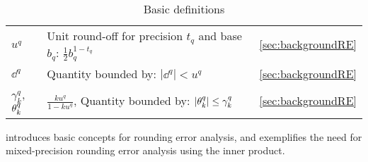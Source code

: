 \begin{table}[H]
\begin{tabular}{|m{1.7cm}|m{10.3cm}|c|}
		$u^q$ & Unit round-off for precision $t_q$ and base $b_q$: $\frac{1}{2}b_q^{1-t_q}$ & \ref{sec:backgroundRE} \\ 
		$\dd^{q}$ &Quantity bounded by: $|\dd^{q}| < u^q$ &  \ref{sec:backgroundRE} \\
		$\gamma^{q}_{k}$,  $\theta^{q}_{k}$& $\frac{ku^q}{1-ku^q}$, Quantity bounded by: $|\theta^{q}_{k}|\leq\gamma^q_{k}$ &  \ref{sec:backgroundRE} \\
		\hline
		\hline		
		\hline
	\end{tabular}
	\caption{Basic definitions}
	\label{table:notation}
\end{table}
 introduces basic concepts for rounding error analysis, and  exemplifies the need for mixed-precision rounding error analysis using the inner product.
